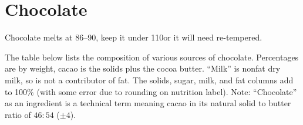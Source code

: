 
\section{Chocolate}\label{chocolate}
Chocolate melts at 86--90\degF, keep it under 110\degF or it will need
re-tempered.

The table below lists the composition of various sources of chocolate. Percentages
are by weight, cacao is the solids plus the cocoa butter. ``Milk'' is nonfat dry
milk, so is not a contributor of fat. The solids, sugar, milk, and fat columns add to
100\% (with some error due to rounding on nutrition label). Note: ``Chocolate'' as an
ingredient is a technical term meaning cacao in its natural solid to butter ratio of
$46:54$ ($\pm4$).

%
%
%




